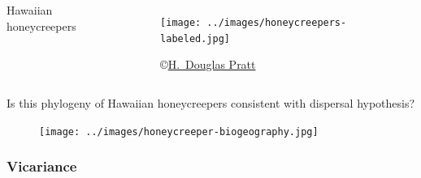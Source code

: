 \begin{noheadline}
\begin{frame}[t]
    \begin{adjustwidth}{-2em}{-1.5em}
        \begin{columns}
            Hawaiian honeycreepers

            \begin{figure}
                \begin{center}
                    \texttt{[image: ../images/honeycreepers-labeled.jpg]}
                    \caption{\tiny \copyright \href{http://www.hdouglaspratt.com/}{H.\ Douglas Pratt}}
                \end{center}
            \end{figure}
        \end{columns}
    \end{adjustwidth}
\end{frame}
\end{noheadline}
\begin{noheadline}
\begin{frame}[t]
    \begin{adjustwidth}{-2em}{-1.5em}
    {\small Is this phylogeny of Hawaiian honeycreepers consistent with dispersal hypothesis?}
        \begin{figure}
            \begin{center}
                \texttt{[image: ../images/honeycreeper-biogeography.jpg]}
                \caption{}
            \end{center}
        \end{figure}
    \end{adjustwidth}
\end{frame}
\end{noheadline}

\subsubsection{Vicariance}

